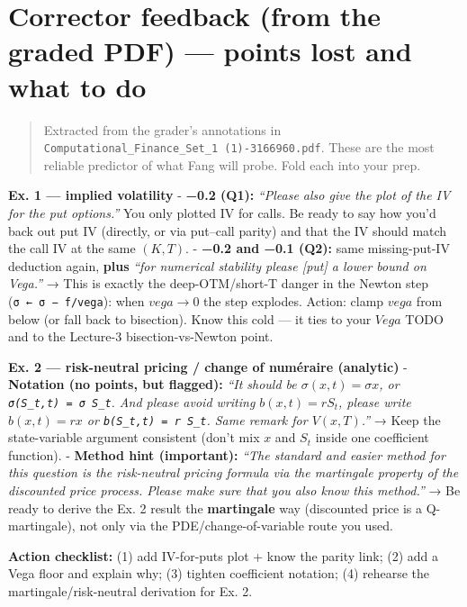 \documentclass[
  11pt,
]{article}
\begin{document}
\hypertarget{corrector-feedback-from-the-graded-pdf-points-lost-and-what-to-do}{%
\section{Corrector feedback (from the graded PDF) --- points lost and
what to
do}\label{corrector-feedback-from-the-graded-pdf-points-lost-and-what-to-do}}

\begin{quote}
Extracted from the grader's annotations in
\texttt{Computational\_Finance\_Set\_1\ (1)-3166960.pdf}. These are the
most reliable predictor of what Fang will probe. Fold each into your
prep.
\end{quote}

\textbf{Ex. 1 --- implied volatility} - \textbf{−0.2 (Q1):}
\emph{``Please also give the plot of the IV for the put options.''} You
only plotted IV for calls. Be ready to say how you'd back out put IV
(directly, or via put--call parity) and that the IV should match the
call IV at the same \((K,T)\). - \textbf{−0.2 and −0.1 (Q2):} same
missing-put-IV deduction again, \textbf{plus} \emph{``for numerical
stability please {[}put{]} a lower bound on Vega.''} → This is exactly
the deep-OTM/short-T danger in the Newton step
(\texttt{σ\ ←\ σ\ −\ f/vega}): when \(vega → 0\) the step explodes.
Action: clamp \(vega\) from below (or fall back to bisection). Know this
cold --- it ties to your \(Vega\) TODO and to the Lecture-3
bisection-vs-Newton point.

\textbf{Ex. 2 --- risk-neutral pricing / change of numéraire (analytic)}
- \textbf{Notation (no points, but flagged):} \emph{``It should be
\(σ(x,t) = σx\), or \texttt{σ(S\_t,t)\ =\ σ\ S\_t}. And please avoid
writing \(b(x,t) = r S_t\), please write \(b(x,t) = r x\) or
\texttt{b(S\_t,t)\ =\ r\ S\_t}. Same remark for \(V(x,T)\).''} → Keep
the state-variable argument consistent (don't mix \(x\) and \(S_t\)
inside one coefficient function). - \textbf{Method hint (important):}
\emph{``The standard and easier method for this question is the
risk-neutral pricing formula via the martingale property of the
discounted price process. Please make sure that you also know this
method.''} → Be ready to derive the Ex. 2 result the \textbf{martingale}
way (discounted price is a Q-martingale), not only via the
PDE/change-of-variable route you used.

\textbf{Action checklist:} (1) add IV-for-puts plot + know the parity
link; (2) add a Vega floor and explain why; (3) tighten coefficient
notation; (4) rehearse the martingale/risk-neutral derivation for Ex. 2.
\end{document}
